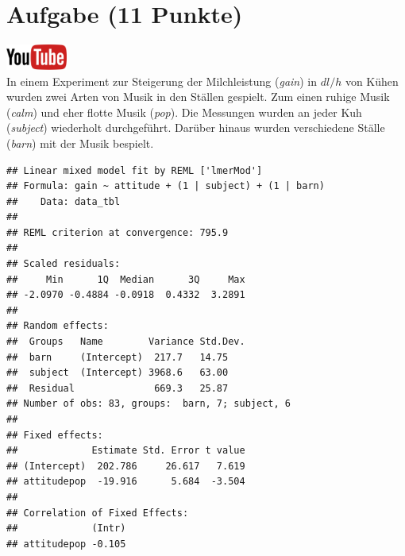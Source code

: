 \documentclass[a4paper, 10pt]{scrartcl}\usepackage[]{graphicx}\usepackage[]{xcolor}
\makeatletter
\newenvironment{kframe}{%
 \def\at@end@of@kframe{}%
 \ifinner\ifhmode%
  \def\at@end@of@kframe{\end{minipage}}%
  \begin{minipage}{\columnwidth}%
 \fi\fi%
 \def\FrameCommand##1{\hskip\@totalleftmargin \hskip-\fboxsep
 \colorbox{shadecolor}{##1}\hskip-\fboxsep
     \hskip-\linewidth \hskip-\@totalleftmargin \hskip\columnwidth}%
 \MakeFramed {\advance\hsize-\width
   \@totalleftmargin\z@ \linewidth\hsize
   \@setminipage}}%
 {\par\unskip\endMakeFramed%
 \at@end@of@kframe}
\newenvironment{knitrout}{}{} %
\makeatother
\begin{document}
\clearpage

\section{Aufgabe \hfill (11 Punkte)}

\hfill\href{https://youtu.be/ysai7umvPoA}{\includegraphics[width =
  2cm]{img/youtube}}\\[1Ex]


In einem Experiment zur Steigerung der Milchleistung (\textit{gain}) in $dl/h$ von
K{\"u}hen wurden zwei Arten von Musik in den St{\"a}llen gespielt. Zum einen ruhige
Musik (\textit{calm}) und eher flotte Musik (\textit{pop}). Die Messungen
wurden an jeder Kuh (\textit{subject}) wiederholt durchgef{\"u}hrt. Dar{\"u}ber
hinaus wurden verschiedene St{\"a}lle (\textit{barn}) mit der Musik bespielt.

\begin{knitrout}
\color{fgcolor}\begin{kframe}
\begin{verbatim}
## Linear mixed model fit by REML ['lmerMod']
## Formula: gain ~ attitude + (1 | subject) + (1 | barn)
##    Data: data_tbl
## 
## REML criterion at convergence: 795.9
## 
## Scaled residuals: 
##     Min      1Q  Median      3Q     Max 
## -2.0970 -0.4884 -0.0918  0.4332  3.2891 
## 
## Random effects:
##  Groups   Name        Variance Std.Dev.
##  barn     (Intercept)  217.7   14.75   
##  subject  (Intercept) 3968.6   63.00   
##  Residual              669.3   25.87   
## Number of obs: 83, groups:  barn, 7; subject, 6
## 
## Fixed effects:
##             Estimate Std. Error t value
## (Intercept)  202.786     26.617   7.619
## attitudepop  -19.916      5.684  -3.504
## 
## Correlation of Fixed Effects:
##             (Intr)
## attitudepop -0.105
\end{verbatim}
\end{kframe}
\end{knitrout}
\end{document}
